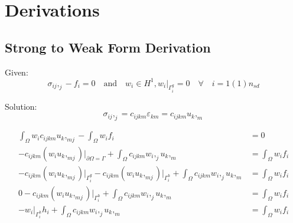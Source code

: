 \documentclass[a4paper, 12pt]{article}
\begin{document}
\newpage
\section{Derivations} \label{sec:Derivations}

\subsection{Strong to Weak Form Derivation} \label{sec:WeakDer}

Given:
\begin{equation*}
\sigma_{ij},_{j} - f_{i} = 0 \quad \text{and} \quad
w_{i} \in H^1, w_{i}\Big|_{\Gamma^{g}_{i}} = 0
    \quad \forall \quad i=1(1)n_{sd}
\end{equation*}

\noindent
Solution:
\begin{equation*}
\sigma_{ij},_{j} = c_{ijkm} \varepsilon_{km} = c_{ijkm} u_{k},_{m}
\end{equation*}

\begin{align*}
\int_{\Omega} w_{i} c_{ijkm} u_{k},_{mj} - \int_{\Omega} w_{i} f_{i} &= 0 \\
-c_{ijkm}(w_{i} u_{k},_{mj})\Big|_{\partial\Omega = \Gamma} 
  + \int_{\Omega} c_{ijkm} w_{i},_{j} u_{k},_{m}
  &=\int_{\Omega} w_{i} f_{i}  \\
-c_{ijkm}(w_{i} u_{k},_{mj})\Big|_{\Gamma^{g}_{i}} 
-c_{ijkm}(w_{i} u_{k},_{mj})\Big|_{\Gamma^{h}_{i}} 
  + \int_{\Omega} c_{ijkm} w_{i},_{j} u_{k},_{m}
  &=\int_{\Omega} w_{i} f_{i}  \\
0
-c_{ijkm}(w_{i} u_{k},_{mj})\Big|_{\Gamma^{h}_{i}} 
  + \int_{\Omega} c_{ijkm} w_{i},_{j} u_{k},_{m}
  &=\int_{\Omega} w_{i} f_{i}  \\
-w_{i}\Big|_{\Gamma^{h}_{i}} h_{i}
  + \int_{\Omega} c_{ijkm} w_{i},_{j} u_{k},_{m}
  &=\int_{\Omega} w_{i} f_{i}  \\
\end{align*}
\end{document}
